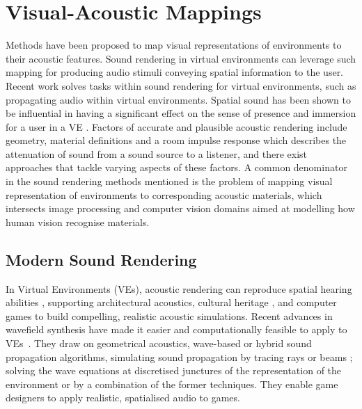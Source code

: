 \section{Visual-Acoustic Mappings}\label{sec:lr-visual-acoustic-mapping}

Methods have been proposed to map visual representations of environments to their acoustic features. Sound rendering in virtual environments can leverage such mapping for producing audio stimuli conveying spatial information to the user. Recent work solves tasks within sound rendering for virtual environments, such as propagating audio within virtual environments. 
Spatial sound has been shown to be influential in having a significant effect on the sense of presence and immersion for a user in a VE \cite{poeschl13}. Factors of accurate and plausible acoustic rendering include geometry, material definitions and a room impulse response which describes the attenuation of sound from a sound source to a listener, and there exist approaches that tackle varying aspects of these factors.
A common denominator in the sound rendering methods mentioned is the problem of mapping visual representation of environments to corresponding acoustic materials, which intersects image processing and computer vision domains aimed at modelling how human vision recognise materials.\par%

\subsection{Modern Sound Rendering}
In Virtual Environments (VEs), acoustic rendering can reproduce spatial hearing abilities \cite{lokki2005navigation}, supporting architectural acoustics, cultural heritage \cite{berardi2016acoustic, vorlander2015virtual}, and computer games \cite{raghuvanshi2014parametric, mehra2015wave} to build compelling, realistic acoustic simulations. Recent advances in wavefield synthesis have made it easier and computationally feasible to apply to VEs~\cite{raghuvanshi2014parametric}. They draw on geometrical acoustics, wave-based or hybrid sound propagation algorithms, simulating sound propagation by tracing rays or beams \cite{hulusic2012acoustic}; solving the wave equations at discretised junctures of the representation of the environment or by a combination of the former techniques. They enable game designers to apply realistic, spatialised audio to games.

